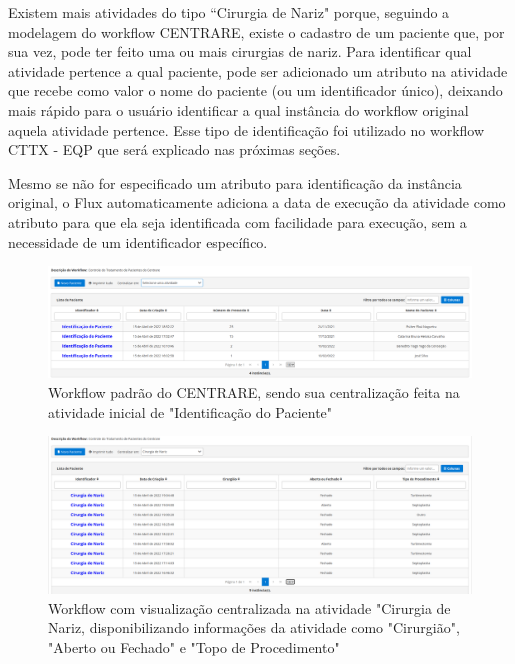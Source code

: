 Existem mais atividades do tipo ``Cirurgia de Nariz" porque, seguindo a modelagem do workflow CENTRARE, existe o cadastro de um paciente que, por sua vez, pode ter feito uma ou mais cirurgias de nariz. Para identificar qual atividade pertence a qual paciente, pode ser adicionado um atributo na atividade que recebe como valor o nome do paciente (ou um identificador único), deixando mais rápido para o usuário identificar a qual instância do workflow original aquela atividade pertence. Esse tipo de identificação foi utilizado no workflow CTTX - EQP que será explicado nas próximas seções.

Mesmo se não for especificado um atributo para identificação da instância original, o Flux automaticamente adiciona a data de execução da atividade como atributo para que ela seja identificada com facilidade para execução, sem a necessidade de um identificador específico.

\begin{figure}
    \centering
    \includegraphics[width=1\textwidth]{imgs/CENTRARE/instanciaNormal.png}
    \caption{Workflow padrão do CENTRARE, sendo sua centralização feita na atividade inicial de "Identificação do Paciente"}
    \label{fig:normalInstance}
\end{figure}

\begin{figure}
    \centering
    \includegraphics[width=1\textwidth]{imgs/CENTRARE/instanciaAlterada.png}
    \caption{Workflow com visualização centralizada na atividade "Cirurgia de Nariz, disponibilizando informações da atividade como "Cirurgião", "Aberto ou Fechado" e "Topo de Procedimento"}
    \label{fig:changedInstance}
\end{figure}

